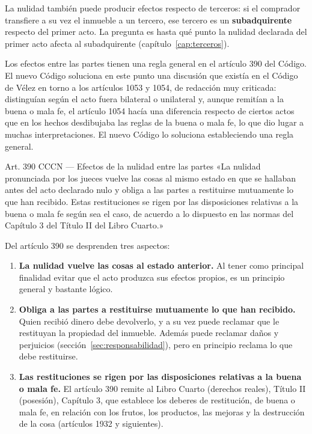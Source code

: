 \documentclass[12pt,oneside]{book}
\begin{document}
La nulidad también puede producir efectos respecto de terceros: si el comprador transfiere a su vez el inmueble a un tercero, ese tercero es un \textbf{subadquirente} respecto del primer acto. La pregunta es hasta qué punto la nulidad declarada del primer acto afecta al subadquirente (capítulo~\ref{cap:terceros}).

Los efectos entre las partes tienen una regla general en el artículo 390 del Código. El nuevo Código soluciona en este punto una discusión que existía en el Código de Vélez en torno a los artículos 1053 y 1054, de redacción muy criticada: distinguían según el acto fuera bilateral o unilateral y, aunque remitían a la buena o mala fe, el artículo 1054 hacía una diferencia respecto de ciertos actos que en los hechos desdibujaba las reglas de la buena o mala fe, lo que dio lugar a muchas interpretaciones. El nuevo Código lo soluciona estableciendo una regla general.

\begin{articulo}{Art. 390 CCCN --- Efectos de la nulidad entre las partes}
«La nulidad pronunciada por los jueces vuelve las cosas al mismo estado en que se hallaban antes del acto declarado nulo y obliga a las partes a restituirse mutuamente lo que han recibido. Estas restituciones se rigen por las disposiciones relativas a la buena o mala fe según sea el caso, de acuerdo a lo dispuesto en las normas del Capítulo 3 del Título II del Libro Cuarto.»
\end{articulo}

Del artículo 390 se desprenden tres aspectos:

\begin{enumerate}
    \item \textbf{La nulidad vuelve las cosas al estado anterior.} Al tener como principal finalidad evitar que el acto produzca sus efectos propios, es un principio general y bastante lógico.
    \item \textbf{Obliga a las partes a restituirse mutuamente lo que han recibido.} Quien recibió dinero debe devolverlo, y a su vez puede reclamar que le restituyan la propiedad del inmueble. Además puede reclamar daños y perjuicios (sección~\ref{sec:responsabilidad}), pero en principio reclama lo que debe restituirse.
    \item \textbf{Las restituciones se rigen por las disposiciones relativas a la buena o mala fe.} El artículo 390 remite al Libro Cuarto (derechos reales), Título II (posesión), Capítulo 3, que establece los deberes de restitución, de buena o mala fe, en relación con los frutos, los productos, las mejoras y la destrucción de la cosa (artículos 1932 y siguientes).
\end{enumerate}
\end{document}
